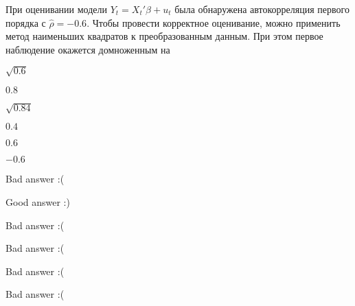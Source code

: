
\begin{question}
При оценивании модели \(Y_t = X_t' \beta + u_t\) была обнаружена автокорреляция первого порядка с \(\hat\rho = -0.6\). Чтобы провести корректное оценивание, можно применить метод наименьших квадратов к преобразованным данным. При этом первое наблюдение окажется домноженным на
\begin{answerlist}
  \item \(\sqrt{0.6}\)
  \item \(0.8\)
  \item \(\sqrt{0.84}\)
  \item \(0.4\)
  \item \(0.6\)
  \item \(-0.6\)
\end{answerlist}
\end{question}

\begin{solution}
\begin{answerlist}
  \item Bad answer :(
  \item Good answer :)
  \item Bad answer :(
  \item Bad answer :(
  \item Bad answer :(
  \item Bad answer :(
\end{answerlist}
\end{solution}

